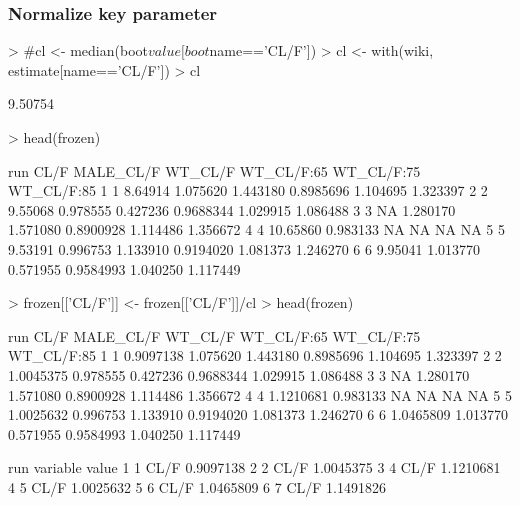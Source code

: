 \subsubsection{Normalize key parameter}
\begin{Schunk}
\begin{Sinput}
> #cl <- median(boot$value[boot$name=='CL/F'])
> cl <- with(wiki, estimate[name=='CL/F'])
> cl
\end{Sinput}
\begin{Soutput}
[1] 9.50754
\end{Soutput}
\begin{Sinput}
> head(frozen)
\end{Sinput}
\begin{Soutput}
  run     CL/F MALE_CL/F  WT_CL/F WT_CL/F:65 WT_CL/F:75 WT_CL/F:85
1   1  8.64914  1.075620 1.443180  0.8985696   1.104695   1.323397
2   2  9.55068  0.978555 0.427236  0.9688344   1.029915   1.086488
3   3       NA  1.280170 1.571080  0.8900928   1.114486   1.356672
4   4 10.65860  0.983133       NA         NA         NA         NA
5   5  9.53191  0.996753 1.133910  0.9194020   1.081373   1.246270
6   6  9.95041  1.013770 0.571955  0.9584993   1.040250   1.117449
\end{Soutput}
\begin{Sinput}
> frozen[['CL/F']] <- frozen[['CL/F']]/cl
> head(frozen)
\end{Sinput}
\begin{Soutput}
  run      CL/F MALE_CL/F  WT_CL/F WT_CL/F:65 WT_CL/F:75 WT_CL/F:85
1   1 0.9097138  1.075620 1.443180  0.8985696   1.104695   1.323397
2   2 1.0045375  0.978555 0.427236  0.9688344   1.029915   1.086488
3   3        NA  1.280170 1.571080  0.8900928   1.114486   1.356672
4   4 1.1210681  0.983133       NA         NA         NA         NA
5   5 1.0025632  0.996753 1.133910  0.9194020   1.081373   1.246270
6   6 1.0465809  1.013770 0.571955  0.9584993   1.040250   1.117449
\end{Soutput}
\begin{Soutput}
  run variable     value
1   1     CL/F 0.9097138
2   2     CL/F 1.0045375
3   4     CL/F 1.1210681
4   5     CL/F 1.0025632
5   6     CL/F 1.0465809
6   7     CL/F 1.1491826
\end{Soutput}
\end{Schunk}
